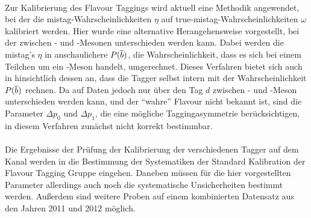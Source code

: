 \\
Zur Kalibrierung des Flavour Taggings wird aktuell eine Methodik angewendet, bei der die mistag-Wahrscheinlichkeiten $\eta$ auf true-mistag-Wahrscheinlichkeiten $\omega$ kalibriert werden. Hier wurde eine alternative Herangehensweise vorgestellt, bei der zwischen \Bz- und \Bzb-Mesonen unterschieden werden kann. Dabei werden die mistag's $\eta$ in anschaulichere $P({\overline {{b}}})$, die Wahrscheinlichkeit, dass es sich bei einem Teilchen um ein \Bz-Meson handelt, umgerechnet. Dieses Verfahren bietet sich auch in hinsichtlich dessen an, dass die Tagger selbst intern mit der Wahrscheinlichkeit $P({\overline {{b}}})$ rechnen. Da auf Daten jedoch nur über den Tag $d$ zwischen \Bz- und \Bzb-Meson unterschieden werden kann, und der \enquote{wahre} Flavour nicht bekannt ist, sind die Parameter $\Delta p_0$ und $\Delta p_1$, die eine mögliche Taggingasymmetrie berücksichtigen, in diesem Verfahren zunächst nicht korrekt bestimmbar.\\
\\
Die Ergebnisse der Prüfung der Kalibrierung der verschiedenen Tagger auf dem Kanal \BdToDpi werden in die Bestimmung der Systematiken der Standard Kalibration der Flavour Tagging Gruppe eingehen. Daneben müssen für die hier vorgestellten Parameter allerdings auch noch die systematische Unsicherheiten bestimmt werden. Außerdem sind weitere Proben auf einem kombinierten Datensatz aus den Jahren \num{2011} und \num{2012} möglich. 